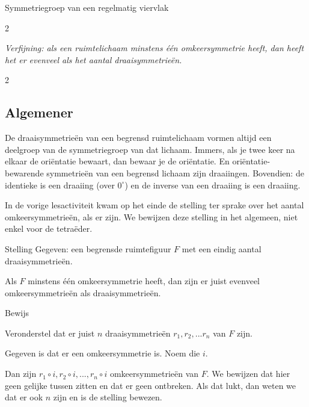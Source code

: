 \begin{lesactiviteit}{Symmetriegroep van een regelmatig viervlak}
\begin{vraagenantwoord}[resume]
\begin{multicols}{2}
 
 \end{multicols}
 
 \emph{Verfijning: als een ruimtelichaam minstens één omkeersymmetrie heeft, dan heeft het er evenveel als het aantal draaisymmetrieën.}
 
 \end{vraagenantwoord}
 
 
\end{lesactiviteit}

	

\begin{multicols}{2}

\subsection{Algemener}
De draaisymmetrieën van een begrensd ruimtelichaam vormen altijd een deelgroep van de symmetriegroep van dat lichaam. Immers, als je twee keer na elkaar de oriëntatie bewaart, dan bewaar je de oriëntatie. En oriëntatie-bewarende symmetrieën van een begrensd lichaam zijn draaiingen. Bovendien: de identieke is een draaiing (over $0^\circ$) en de inverse van een draaiing is een draaiing.

In de vorige lesactiviteit kwam op het einde de stelling ter sprake over het aantal omkeersymmetrieën, als er zijn. We bewijzen deze stelling in het algemeen, niet enkel voor de tetraëder.

\begin{kader}{Stelling}{}
    Gegeven: een begrensde ruimtefiguur $F$ met een eindig aantal draaisymmetrieën. 
    
    Als $F$ minstens één omkeersymmetrie heeft, dan zijn er juist evenveel omkeersymmetrieën als draaisymmetrieën.
    
\end{kader}
    
\begin{kader}{Bewijs}{}
    
    Veronderstel dat er juist $n$ draaisymmetrieën $r_1, r_2, ... r_n$ van $F$ zijn.
    
    Gegeven is dat er een omkeersymmetrie is. Noem die $i$.
    
    Dan zijn $r_1\circ i, r_2\circ i, ..., r_n\circ i$ omkeersymmetrieën van $F$. We bewijzen dat hier geen gelijke tussen zitten en dat er geen ontbreken. Als dat lukt, dan weten we dat er ook $n$ zijn en is de stelling bewezen.
    

\end{kader}
\end{multicols}
